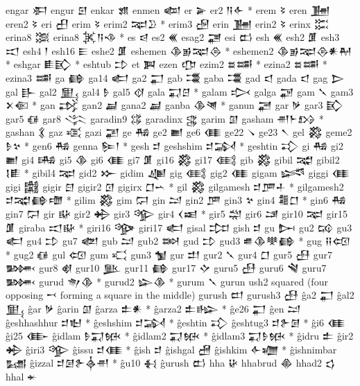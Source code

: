  engar  𒀳   
 engur  𒇉   
 enkar  𒂙   
 enmen  𒆉   
 er  𒅕   
 er2  𒀀𒅆 *   
 erem  𒂟   
 eren  𒂞   
 eren2  𒂟   
 eri  𒌷   
 erim  𒂟   
 erim2  𒉈𒊒 *   
 erim3  𒌿   
 erin  𒂞   
 erin2  𒂟   
 erinx  𒈶   
 erina8  𒈷   
 erina8  𒈸𒀀𒈾 *   
 es  𒁀   
 es2  𒌍   
 esag2  𒃥   
 esi  𒆗   
 esh  𒌍   
 esh2  𒂠   
 esh3  𒀊   
 esh4  𒁹   
 esh16  𒀼   
 eshe2  𒂠   
 eshemen  𒆠𒂊𒉈𒁲 *   
 eshemen2  𒆠𒂊𒉈𒁲𒀭𒈹 *   
 eshgar  𒀾𒃼 *   
 eshtub  𒄞   
 et  𒀉   
 ezen  𒂡   
 ezim2  𒊺𒌁 *   
 ezina2  𒊺𒌁 *   
 ezina3  𒌁   
 ga  𒂵   
 ga14  𒅗   
 ga2  𒂷   
 gab  𒃮   
 gaba  𒃮   
 gad  𒃰   
 gada  𒃰   
 gag  𒆕   
 gal  𒃲   
 gal2  𒅅   
 gal4  𒊩   
 gal5  𒋼   
 gala  𒍑𒆪 *   
 galam  𒃴   
 galga  𒃌   
 gam  𒃵   
 gam3  𒉽𒈿 *   
 gan  𒃶   
 gan2  𒃷   
 gana2  𒃷   
 ganba  𒆠𒇴 *   
 ganun  𒃠   
 gar  𒃻   
 gar3  𒃼   
 gar5  𒈖   
 gar8  𒋞   
 garadin9  𒌏   
 garadinx  𒃱   
 garim  𒇑   
 gasham  𒉣𒈨𒋳 *   
 gashan  𒃽   
 gaz  𒄤   
 gazi  𒃢   
 ge  𒄀   
 ge2  𒆤   
 ge6  𒈪   
 ge22  𒀺   
 ge23  𒀹   
 gel  𒄃   
 geme2  𒊩𒆳 *   
 gen6  𒄀   
 genna  𒌉𒁹 *   
 gesh  𒄑   
 geshshim  𒄑𒋆 *   
 geshtin  𒃾   
 gi  𒄀   
 gi2  𒆤   
 gi4  𒄄   
 gi5  𒆠   
 gi6  𒈪   
 gi7  𒂠   
 gi16  𒄃   
 gi17  𒍼   
 gib  𒄃   
 gibil  𒉋   
 gibil2  𒋙𒀾 *   
 gibil4  𒉈   
 gid2  𒁍   
 gidim  𒄇   
 gig  𒍼   
 gig2  𒈪   
 gigam  𒈓   
 giggi  𒈪   
 gigi  𒄅   
 gigir  𒇀   
 gigir2  𒇥   
 gigirx  𒆸𒌀   *   
 gil  𒄃   
 gilgamesh  𒄑𒂆𒈦 *   
 gilgamesh2  𒄑𒉋𒂵𒈩 *   
 gilim  𒄃   
 gim  𒁶   
 gin  𒁺   
 gin2  𒂆   
 gin3  𒆳   
 gin4  𒍤𒆸 *   
 gin6  𒄀   
 gin7  𒁶   
 gir  𒄫   
 gir2  𒄈   
 gir3  𒄊   
 gir4  𒌋𒀜 *   
 gir5  𒁽   
 gir6  𒁼   
 gir10  𒉈   
 gir15  𒂠   
 giraba  𒀊𒄫 *   
 giri16  𒄌   
 giri17  𒅗   
 gisal  𒄐   
 gish  𒄑   
 gu  𒄖   
 gu2  𒄘   
 gu3  𒅗   
 gu4  𒄞   
 gu7  𒅥   
 gub  𒁺   
 gub2  𒇷   
 gud  𒄞   
 gud3  𒌑𒆠𒋧𒂵 *   
 gug  𒍝𒄢 *   
 gug2  𒈖   
 gul  𒄢   
 gum  𒄣   
 gun3  𒁯   
 gur  𒄥   
 gur2  𒃵   
 gur4  𒆸   
 gur5  𒍀   
 gur7  𒄦   
 gur8  𒋽   
 gur10  𒆥   
 gur11  𒂵   
 gur17  𒄕   
 guru5  𒍀   
 guru6  𒃸   
 guru7  𒄦   
 gurud  𒉩𒆠 *   
 gurud2  𒇽𒆠 *   
 gurum  𒃵   
 gurun  ush2 squared (four opposing 𒍗 forming a square in the  
   middle)   
 gurush  𒄨   
 gurush3  𒍀   
 ĝa2  𒂷   
 ĝal2  𒅅   
 ĝar  𒃻   
 ĝarin  𒇑   
 ĝarza  𒉺𒀭 *   
 ĝarza2  𒉺𒈗 *   
 ĝe26  𒂷   
 ĝen  𒁺   
 ĝeshhashhur  𒄑𒈢 *   
 ĝeshshim  𒄑𒋆 *   
 ĝeshtin  𒃾   
 ĝeshtug3  𒄑𒉿𒌆 *   
 ĝi6  𒈪   
 ĝi25  𒂂   
 ĝidlam  𒊩𒍑𒁮 *   
 ĝidlam2  𒍑𒁮 *   
 ĝidlam3  𒍑𒊩𒁮 *   
 ĝidru  𒉺   
 ĝir2  𒄈   
 ĝiri3  𒄊   
 ĝissu  𒄑𒈪 *   
 ĝish  𒄑   
 ĝishgal  𒍇   
 ĝishkim  𒅆𒁾 *   
 ĝishnimbar  𒊷   
 ĝizzal  𒄑𒌆𒉿𒎓𒉣 *   
 ĝu10  𒈬   
 ĝurush  𒆗   
 hha  𒄩   
 hhabrud  𒆢   
 hhad2  𒌓   
 hhal  𒄬   
